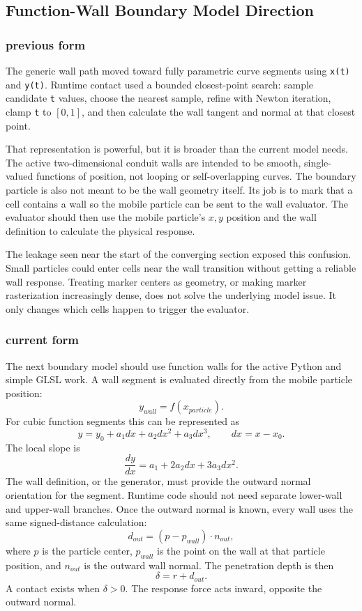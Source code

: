 \subsection{Function-Wall Boundary Model Direction}

\subsubsection{previous form}

The generic wall path moved toward fully parametric curve segments using
\texttt{x(t)} and \texttt{y(t)}.  Runtime contact used a bounded closest-point
search: sample candidate \texttt{t} values, choose the nearest sample, refine
with Newton iteration, clamp \texttt{t} to \([0,1]\), and then calculate the
wall tangent and normal at that closest point.

That representation is powerful, but it is broader than the current model
needs.  The active two-dimensional conduit walls are intended to be smooth,
single-valued functions of position, not looping or self-overlapping curves.
The boundary particle is also not meant to be the wall geometry itself.  Its
job is to mark that a cell contains a wall so the mobile particle can be sent
to the wall evaluator.  The evaluator should then use the mobile particle's
\(x,y\) position and the wall definition to calculate the physical response.

The leakage seen near the start of the converging section exposed this
confusion.  Small particles could enter cells near the wall transition without
getting a reliable wall response.  Treating marker centers as geometry, or
making marker rasterization increasingly dense, does not solve the underlying
model issue.  It only changes which cells happen to trigger the evaluator.

\subsubsection{current form}

The next boundary model should use function walls for the active Python and
simple GLSL work.  A wall segment is evaluated directly from the mobile
particle position:
\[
    y_{wall} = f(x_{particle}).
\]
For cubic function segments this can be represented as
\[
    y = y_0 + a_1 dx + a_2 dx^2 + a_3 dx^3,
    \qquad dx = x - x_0.
\]
The local slope is
\[
    \frac{dy}{dx} = a_1 + 2a_2 dx + 3a_3 dx^2.
\]
The wall definition, or the generator, must provide the outward normal
orientation for the segment.  Runtime code should not need separate lower-wall
and upper-wall branches.  Once the outward normal is known, every wall uses the
same signed-distance calculation:
\[
    d_{out} = (p - p_{wall}) \cdot n_{out},
\]
where \(p\) is the particle center, \(p_{wall}\) is the point on the wall at
that particle position, and \(n_{out}\) is the outward wall normal.  The
penetration depth is then
\[
    \delta = r + d_{out}.
\]
A contact exists when \(\delta > 0\).  The response force acts inward, opposite
the outward normal.

